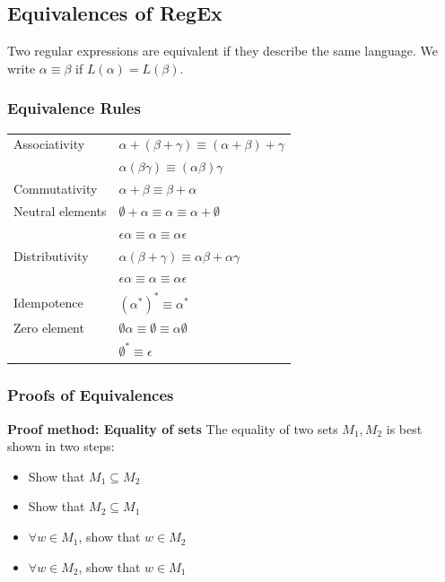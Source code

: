 \documentclass[a3paper, 8pt]{extarticle}
\begin{document}
\begin{multicols*}{6}
\subsection{ Equivalences of RegEx}
Two regular expressions are equivalent if they describe the same language. We write $\alpha \equiv \beta$ if $L(\alpha) = L(\beta)$.

\subsubsection{Equivalence Rules} 

\begin{tabular}{l l}
  Associativity &$\alpha + (\beta + \gamma) \equiv (\alpha + \beta) + \gamma$\\
     &$\alpha (\beta \gamma) \equiv (\alpha \beta) \gamma$ \vspace{7pt}\\ 
Commutativity &$\alpha + \beta \equiv \beta + \alpha$ \vspace{7pt} \\ 
Neutral elements & $\emptyset + \alpha \equiv \alpha \equiv \alpha + \emptyset$\\
&$\epsilon \alpha \equiv \alpha \equiv \alpha \epsilon$ \vspace{7pt}\\ 
Distributivity & $\alpha(\beta + \gamma) \equiv \alpha \beta + \alpha \gamma$\\
&$\epsilon \alpha \equiv \alpha \equiv \alpha \epsilon$\vspace{7pt} \\
Idempotence & $(\alpha^*)^* \equiv \alpha^*$ \vspace{7pt} \\
Zero element & $\emptyset \alpha \equiv \emptyset \equiv \alpha \emptyset$\\
& $\emptyset^* \equiv \epsilon$
\end{tabular}


\subsubsection{Proofs of Equivalences} 

        
        \textbf{Proof method: Equality of sets} The equality of two sets $M_1, M_2$ is best shown in two steps:
            \begin{itemize}
                \item Show that $M_1 \subseteq M_2$
                \item Show that $M_2 \subseteq M_1$
                \item $\forall w \in M_1$, show that $w \in M_2$
                \item $\forall w \in M_2$, show that $w \in M_1$
            \end{itemize}
        

\end{multicols*}
\end{document}
